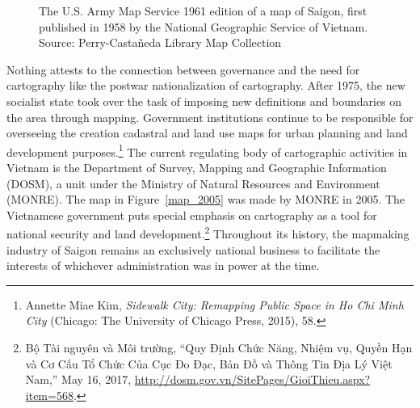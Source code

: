 \begin{figure}[!ht]\centering
\subfigure
{}
\qquad
\subfigure
{}
\vspace{-.3 in}
\caption[U.S. Army Map Service's 1961 map of Saigon]{The U.S. Army Map Service 1961 edition of a map of Saigon, first published in 1958 by the National Geographic Service of Vietnam. Source: Perry-Castañeda Library
Map Collection}\label{map_1961}
\end{figure}

\begin{figure}[!ht]
\end{figure}

\vi
Nothing attests to the connection between governance and the need for cartography like the postwar nationalization of cartography. After 1975, the new socialist state took over the task of imposing new definitions and boundaries on the area through mapping. Government institutions continue to be responsible for overseeing the creation cadastral and land use maps for urban planning and land development purposes.\footnote{Annette Miae Kim, \textit{Sidewalk City: Remapping Public Space in Ho Chi Minh City} (Chicago: The University of Chicago Press, 2015), 58.} The current regulating body of cartographic activities in Vietnam is the Department of Survey, Mapping and Geographic Information (DOSM), a unit under the Ministry of Natural Resources and Environment (MONRE). The map in Figure~\ref{map_2005} was made by MONRE in 2005. The Vietnamese government puts special emphasis on cartography as a tool for national security and land development.\footnote{Bộ Tài nguyên và Môi trường, “Quy Định Chức Năng, Nhiệm vụ, Quyền Hạn và Cơ Cấu Tổ Chức Của Cục Đo Đạc, Bản Đồ và Thông Tin Địa Lý Việt Nam,” May 16, 2017, \url{http://dosm.gov.vn/SitePages/GioiThieu.aspx?item=568}.} Throughout its history, the mapmaking industry of Saigon remains an exclusively national business to facilitate the interests of whichever administration was in power at the time.

